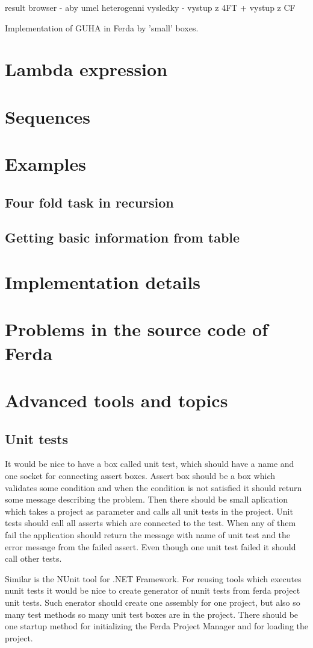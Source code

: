 \documentclass[a4paper,12pt]{book}
\begin{document}
result browser - aby umel heterogenni vysledky - vystup z 4FT + vystup z CF

Implementation of GUHA in Ferda by 'small' boxes.
\section{Lambda expression}
\section{Sequences}
\section{Examples}
\subsection{Four fold task in recursion}
\subsection{Getting basic information from table}
\section{Implementation details}
\section{Problems in the source code of Ferda}
\section{Advanced tools and topics}
\subsection{Unit tests}
It would be nice to have a box called unit test, which should have a name and one socket for connecting assert boxes. Assert box should be a box which validates some condition and when the condition is not satisfied it should return some message describing the problem. Then there should be small aplication which takes a project as parameter and calls all unit tests in the project. Unit tests should call all asserts which are connected to the test. When any of them fail the application should return the message with name of unit test and the error message from the failed assert. Even though one unit test failed it should call other tests.

Similar is the NUnit tool for .NET Framework. For reusing tools which executes nunit tests it would be nice to create generator of nunit tests from ferda project unit tests. Such enerator should create one assembly for one project, but also so many test methods so many unit test boxes are in the project. There should be one startup method for initializing the Ferda Project Manager and for loading the project. 
\end{document}
